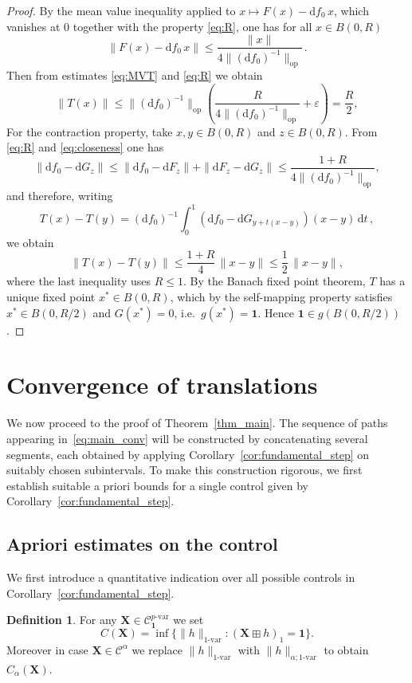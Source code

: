 \documentclass[12pt,a4paper]{article}
\numberwithin{equation}{section}
\theoremstyle{plain}
\theoremstyle{definition}
\newtheorem{definition}[theorem]{Definition}
\theoremstyle{remark}
\begin{document}
\begin{proof}
By the mean value inequality applied to $x\mapsto F(x)-\mathrm{d}f_0\,x$, which vanishes at $0$ together with  the property \eqref{eq:R}, one has for all $x\in B(0,R)$
\begin{equation}\label{eq:MVT}
    \|F(x) - \mathrm{d}f_0\,x\| \leq \frac{\|x\|}{4\|(\mathrm{d}f_0)^{-1}\|_{\text{op}}}\,.
\end{equation}
Then from estimates \eqref{eq:MVT} and \eqref{eq:R} we obtain
\[
    \|T(x)\| \leq \|(\mathrm{d}f_0)^{-1}\|_{\text{op}}\!\left(\frac{R}{4\|(\mathrm{d}f_0)^{-1}\|_{\text{op}}}
    + \varepsilon\right) = \frac{R}{2},
\]
For the contraction property, take  $x,y\in B(0,R) $ and $z\in B(0,R)$. From  \eqref{eq:R} and \eqref{eq:closeness} one has
\[
    \|\mathrm{d}f_0 - \mathrm{d}G_z\|
    \leq \|\mathrm{d}f_0 - \mathrm{d}F_z\| + \|\mathrm{d}F_z-\mathrm{d}G_z\|
    \leq \frac{1+R}{4\|(\mathrm{d}f_0)^{-1}\|_{\text{op}}},
\]
and therefore, writing \[T(x)-T(y) = (\mathrm{d}f_0)^{-1}\int_0^1(\mathrm{d}f_0 -
\mathrm{d}G_{y+t(x-y)})(x-y)\,\mathrm{d}t\,,\]
we obtain
\[
    \|T(x)-T(y)\| \leq \frac{1+R}{4}\,\|x-y\| \leq \frac{1}{2}\,\|x-y\|,
\]
where the last inequality uses $R\leq 1$. By the Banach fixed point theorem, $T$ has a
unique fixed point $x^*\in B(0,R) $, which by the self-mapping property satisfies $x^*\in B(0,R/2)$ and $G(x^*)=0$, i.e.\ $g(x^*)=\mathbf{1}$.
Hence $\mathbf{1}\in g(B(0,R/2))$.
\end{proof}


\section{Convergence of translations} \label{sec:3}

We now proceed to the proof of Theorem~\ref{thm_main}. The sequence of paths appearing in~\eqref{eq:main_conv} will be constructed by concatenating several segments, each obtained by applying Corollary~\ref{cor:fundamental_step} on suitably chosen subintervals. To make this construction rigorous, we first establish suitable a priori bounds for a single control given by Corollary~\ref{cor:fundamental_step}. \subsection{Apriori estimates on the control}

We first introduce a quantitative indication over all possible controls in Corollary~\ref{cor:fundamental_step}.
\begin{definition}
For any \( \mathbf{X} \in \mathcal{C}^{p\text{-var}}_{\mathbf{1}} \) we set
$$
C(\mathbf{X}) = \inf\{\| h \|_{1\text{-var}} \colon (\mathbf{X} \boxplus h)_{1} = \mathbf{1}\}.
$$
Moreover in case $\mathbf{X} \in \mathcal{C}^{\alpha} $ we replace $\| h \|_{1\text{-var}}$ with $\| h \|_{\alpha;1\text{-var}}$ to obtain $C_{\alpha}(\mathbf{X})$.
\end{definition}
\end{document}

